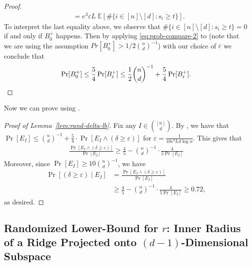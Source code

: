 \documentclass{article}\usepackage[a4paper,margin=20mm]{geometry}
\newcommand{\E}{\mathbb E}
\newcommand{\eps}{\varepsilon} %
\begin{document}
\begin{proof}
\begin{align}
      &= e^3 \eps L \; \E[\#\{i \in [n] \setminus [d] : s_i \geq t \}]. \label{eq:prob-compare-2}
    \end{align}
    To interpret the last equality above, we observe that
    $\#\{i \in [n] \setminus [d] : s_i \geq t \} = 0$ if and only if $B_0^+$ happens.
    Then by applying \eqref{eq:prob-compare-2} to  (note that we are using the assumption $Pr[B_{0}^{+}] > 1/2 \binom{n}{d}^{-1}$) with our choice of $\eps$
    we conclude that 
    \[
    \Pr[B_{0}^{+}] \leq \frac{5}{4} \Pr[B_{\varepsilon}^{+}] \leq \frac{1}{2} \binom{n}{d}^{-1} + \frac{5}{4} \Pr[B_{\varepsilon}^{+}].\qedhere
    \]
\end{proof}



Now we can prove  using .

\begin{proof}[Proof of Lemma~\ref{lem:rand-delta-lb}]
    Fix any $I \in \binom{[n]}{d}$.
    By , we have that $\Pr[E_I ] \leq \binom{n}{d}^{-1} + \frac{5}{4} \cdot \Pr[E_I  \wedge (\delta \geq \eps)]$ for $\eps = \frac{1}{10e^3 Ld\log n}$.
    This gives that
    \begin{align*}
         \frac{\Pr[E_I  \wedge (\delta \geq \eps)]}{\Pr[E_I ]}  \geq \frac{4}{5} - \binom{n}{d}^{-1} \cdot \frac{4}{5\Pr[E_I ]}
    \end{align*}
    Moreover, since $\Pr[E_I ] \geq 10 \binom{n}{d}^{-1}$, we have
    \begin{align*}
        \Pr[(\delta \geq \eps) \mid E_I  ] &= \frac{\Pr[E_I  \wedge (\delta \geq \eps)]}{\Pr[E_I  ]} \\
        &\geq \frac{4}{5} - \binom{n}{d}^{-1} \cdot \frac{4}{5\Pr[E_I ]} \geq 0.72,
    \end{align*}
    as desired.
\end{proof}


\subsection{Randomized Lower-Bound for \texorpdfstring{$r$}{r}: Inner Radius of a Ridge Projected onto \texorpdfstring{$(d-1)$}{d-1}-Dimensional Subspace}\label{sub:rand-r-lb}
\end{document}
